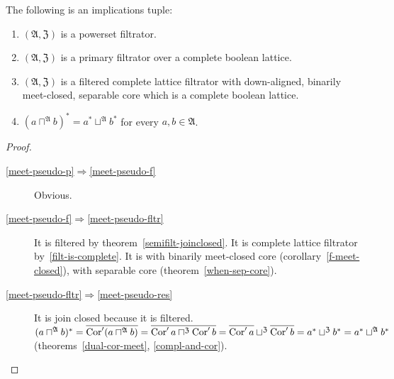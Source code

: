 \begin{thm}
The following is an implications tuple:
\begin{enumerate}
\item \label{meet-pseudo-p}$(\mathfrak{A},\mathfrak{Z})$ is a powerset filtrator.
\item \label{meet-pseudo-f}$(\mathfrak{A},\mathfrak{Z})$ is a primary filtrator over a complete boolean lattice.
\item \label{meet-pseudo-fltr}$(\mathfrak{A},\mathfrak{Z})$ is a filtered
complete lattice filtrator with down-aligned, binarily meet-closed,
separable core which is a complete boolean lattice.
\item \label{meet-pseudo-res}$(a\sqcap^{\mathfrak{A}}b)^{\ast}=a^{\ast}\sqcup^{\mathfrak{A}}b^{\ast}$
for every $a,b\in\mathfrak{A}$.
\end{enumerate}
\end{thm}
\begin{proof}
~
\begin{description}
\item [\ref{meet-pseudo-p}$\Rightarrow$\ref{meet-pseudo-f}] Obvious.
\item [\ref{meet-pseudo-f}$\Rightarrow$\ref{meet-pseudo-fltr}]
It is filtered by theorem~\ref{semifilt-joinclosed}. It is complete lattice filtrator by~\ref{filt-is-complete}.
It is with binarily meet-closed core (corollary~\ref{f-meet-closed}),
with separable core (theorem~\ref{when-sep-core}).
\item [\ref{meet-pseudo-fltr}$\Rightarrow$\ref{meet-pseudo-res}]
It is join closed because it is filtered.
$(a\sqcap^{\mathfrak{A}}b)^{\ast} = \overline{\operatorname{Cor}'(a\sqcap^{\mathfrak{A}}b)} =
\overline{\operatorname{Cor}'a\sqcap^{\mathfrak{Z}}\operatorname{Cor}'b} =
\overline{\operatorname{Cor}'a}\sqcup^{\mathfrak{Z}}\overline{\operatorname{Cor}'b} =
a^{\ast}\sqcup^{\mathfrak{Z}}b^{\ast} = a^{\ast}\sqcup^{\mathfrak{A}}b^{\ast}$
(theorems~\ref{dual-cor-meet}, \ref{compl-and-cor}).
\end{description}
\end{proof}

